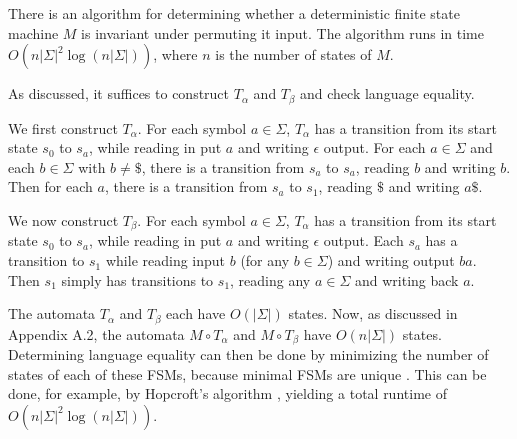 \documentclass{llncs}
\begin{document}
    \begin{theorem}
      There is an algorithm for determining whether a deterministic finite state
      machine $M$ is invariant under permuting it input.
      The algorithm runs in time $O(n|\Sigma|^2\log(n|\Sigma|))$,
      where $n$ is the number of states of $M$.
    \end{theorem}

    As discussed, it suffices to construct $T_\alpha$ and $T_\beta$
    and check language equality.

    We first construct $T_\alpha$.
    For each symbol $a \in \Sigma$,
    $T_\alpha$ has a transition from its start
    state $s_0$ to $s_a$, while reading in put $a$ and
    writing $\epsilon$ output.
    For each $a\in \Sigma$ and each $b\in\Sigma$ with $b\ne \$$, there is a
    transition from $s_a$ to $s_a$, reading $b$
    and writing $b$.
    Then for each $a$, there is a transition from
    $s_a$ to $s_1$, reading $\$$ and writing $a\$$.

    We now construct $T_\beta$.
    For each symbol $a \in \Sigma$,
    $T_\alpha$ has a transition from its start
    state $s_0$ to $s_a$, while reading in put $a$ and
    writing $\epsilon$ output.
    Each $s_a$ has a transition to $s_1$ while
    reading input $b$ (for any $b\in \Sigma$)
    and writing output $ba$.
    Then $s_1$ simply has transitions to $s_1$,
    reading any $a\in \Sigma$ and writing
    back $a$.

    The automata $T_\alpha$ and $T_\beta$ each have $O(|\Sigma|)$ states.
    Now, as discussed in Appendix A.2, the automata 
    $M \circ T_\alpha$ and $M \circ T_\beta$ have $O(n|\Sigma|)$ states.
    Determining language equality can then be done by minimizing the number of
    states of each of these FSMs, because minimal FSMs are unique \cite{hopcroft71}.
    This can be done, for example, by Hopcroft's algorithm \cite{hopcroft71},
    yielding a total runtime of $O(n|\Sigma|^2\log(n|\Sigma|))$.
\end{document}
